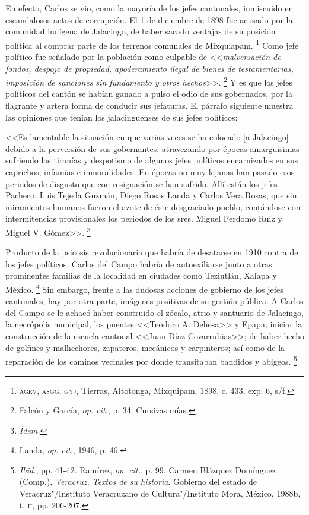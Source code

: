 \documentclass[14pt,twoside,final]{extbook} %
\let\oldfootnote\footnote
\renewcommand\footnote[1]{%
\oldfootnote{\hspace{1mm}#1}}
\begin{document}
En efecto, Carlos se vio, como la mayoría de los jefes cantonales, inmiscuido en escandalosos actos de corrupción. El 1 de diciembre de 1898 fue acusado por la comunidad indígena de Jalacingo, de haber sacado ventajas de su posición política al comprar parte de los terrenos comunales de Mixquiapam.\footnote{\textsc{agev, asgg, gyj}, Tierras, Altotonga, Mixquipam, 1898, c. 433, exp. 6, s/f.} Como jefe político fue señalado por la población como culpable de <<\emph{malversación de fondos, despojo de propiedad, apoderamiento ilegal de bienes de testamentarias, imposición de sanciones sin fundamento y otros hechos}>>.\footnote{Falcón y García, \emph{op. cit.}, p. 34. Cursivas mías.} Y es que los jefes políticos del cantón se habían ganado a pulso el odio de sus gobernados, por la flagrante y artera forma de conducir sus jefaturas. El párrafo siguiente muestra las opiniones que tenían los jalacinguenses de sus jefes políticos:
\begin{quoting}
<<Es lamentable la situación en que varias veces se ha colocado [a Jalacingo] debido a la perversión de sus gobernantes, atravezando por épocas amarguísimas sufriendo las tiranías y despotismo de algunos jefes políticos encarnizados en sus caprichos, infamias e inmoralidades. En épocas no muy lejanas han pasado esos periodos de disgusto que con resignación se han sufrido. Allí están los jefes Pacheco, Luis Tejeda Guzmán, Diego Rosas Landa y Carlos Vera Rosas, que sin miramientos humanos fueron el azote de éste desgraciado pueblo, contándose con intermitencias provisionales los periodos de los sres. Miguel Perdomo Ruiz y Miguel V. Gómez>>.\footnote{\em Ídem.}
\end{quoting}
Producto de la psicosis revolucionaria que habría de desatarse en 1910 contra de los jefes políticos, Carlos del Campo habría de autoexiliarse junto a otras prominentes familias de la localidad en ciudades como Teziutlán, Xalapa y México.\footnote{Landa, \emph{op. cit.}, 1946, p. 46.} Sin embargo, frente a las dudosas acciones de gobierno de los jefes cantonales, hay por otra parte, imágenes positivas de su gestión pública. A Carlos del Campo se le achacó haber construido el zócalo, atrio y santuario de Jalacingo, la necrópolis municipal, los puentes <<Teodoro A. Dehesa>> y Epapa; iniciar la construcción de la escuela cantonal <<Juan Díaz Covarrubias>>; de haber hecho de golfines y malhechores, zapateros, mecánicos y carpinteros; así como de la reparación de los caminos vecinales por donde transitaban bandidos y abigeos.\footnote{\emph{Ibid.}, pp. 41-42. Ramírez, \emph{op. cit.}, p. 99. Carmen Blázquez Domínguez (Comp.), \emph{Veracruz. Textos de su historia}. Gobierno del estado de Veracruz"/Instituto Veracruzano de Cultura"/Instituto Mora, México, 1988b, t. \textsc{ii}, pp. 206-207.}
\end{document}
